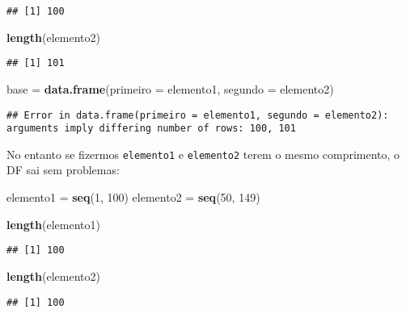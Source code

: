 \documentclass[]{article}
\newenvironment{Shaded}{\begin{snugshade}}{\end{snugshade}}
\newcommand{\DataTypeTok}[1]{\textcolor[rgb]{0.13,0.29,0.53}{#1}}
\newcommand{\DecValTok}[1]{\textcolor[rgb]{0.00,0.00,0.81}{#1}}
\newcommand{\KeywordTok}[1]{\textcolor[rgb]{0.13,0.29,0.53}{\textbf{#1}}}
\newcommand{\NormalTok}[1]{#1}
\newcommand{\StringTok}[1]{\textcolor[rgb]{0.31,0.60,0.02}{#1}}
\begin{document}
\begin{verbatim}
## [1] 100
\end{verbatim}

\begin{Shaded}
\begin{Highlighting}[]
\KeywordTok{length}\NormalTok{(elemento2)}
\end{Highlighting}
\end{Shaded}

\begin{verbatim}
## [1] 101
\end{verbatim}

\begin{Shaded}
\begin{Highlighting}[]
\NormalTok{base =}\StringTok{ }\KeywordTok{data.frame}\NormalTok{(}\DataTypeTok{primeiro =}\NormalTok{ elemento1,}
                  \DataTypeTok{segundo =}\NormalTok{ elemento2)}
\end{Highlighting}
\end{Shaded}

\begin{verbatim}
## Error in data.frame(primeiro = elemento1, segundo = elemento2): arguments imply differing number of rows: 100, 101
\end{verbatim}

No entanto se fizermos \texttt{elemento1} e \texttt{elemento2} terem o
mesmo comprimento, o DF sai sem problemas:

\begin{Shaded}
\begin{Highlighting}[]
\NormalTok{elemento1 =}\StringTok{ }\KeywordTok{seq}\NormalTok{(}\DecValTok{1}\NormalTok{, }\DecValTok{100}\NormalTok{)}
\NormalTok{elemento2 =}\StringTok{ }\KeywordTok{seq}\NormalTok{(}\DecValTok{50}\NormalTok{, }\DecValTok{149}\NormalTok{)}

\KeywordTok{length}\NormalTok{(elemento1)}
\end{Highlighting}
\end{Shaded}

\begin{verbatim}
## [1] 100
\end{verbatim}

\begin{Shaded}
\begin{Highlighting}[]
\KeywordTok{length}\NormalTok{(elemento2)}
\end{Highlighting}
\end{Shaded}

\begin{verbatim}
## [1] 100
\end{verbatim}
\end{document}

